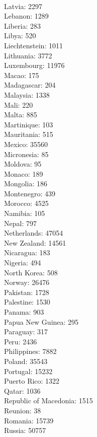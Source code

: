 \begin{multicols}{4}
  \\ Latvia:	2297
  \\ Lebanon:	1289
  \\ Liberia:	283
  \\ Libya:	520
  \\ Liechtenstein:	1011
  \\ Lithuania:	3772
  \\ Luxembourg:	11976
  \\ Macao:	175
  \\ Madagascar:	204
  \\ Malaysia:	1338
  \\ Mali:	220
  \\ Malta:	885
  \\ Martinique:	103
  \\ Mauritania:	515
  \\ Mexico:	35560
  \\ Micronesia:	85
  \\ Moldova:	95
  \\ Monaco:	189
  \\ Mongolia:	186
  \\ Montenegro:	439
  \\ Morocco:	4525
  \\ Namibia:	105
  \\ Nepal:	797
  \\ Netherlands:	47054
  \\ New Zealand:	14561
  \\ Nicaragua:	183
  \\ Nigeria:	494
  \\ North Korea:	508
  \\ Norway:	26476
  \\ Pakistan:	1728
  \\ Palestine:	1530
  \\ Panama:	903
  \\ Papua New Guinea:	295
  \\ Paraguay:	317
  \\ Peru:	2436
  \\ Philippines:	7882
  \\ Poland:	35543
  \\ Portugal:	15232
  \\ Puerto Rico:	1322
  \\ Qatar:	1036
  \\ Republic of Macedonia:	1515
  \\ Reunion:	38
  \\ Romania:	15739
  \\ Russia:	50757

\end{multicols}
